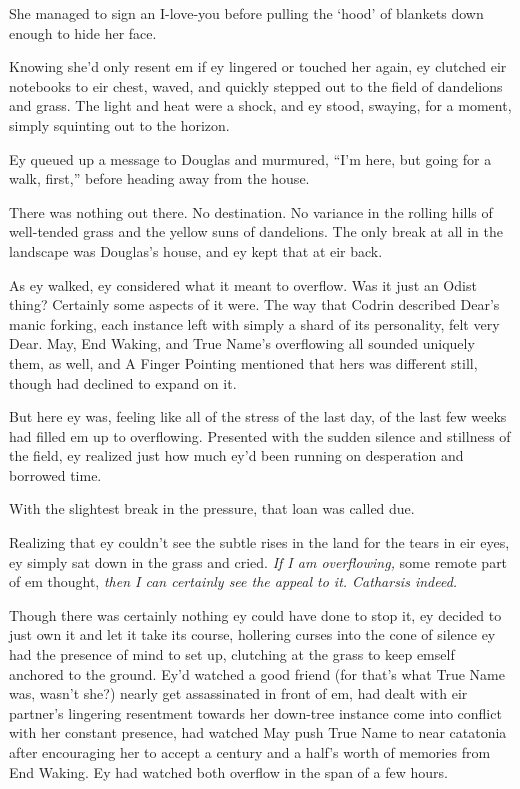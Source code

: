 She managed to sign an I-love-you before pulling the `hood' of blankets down enough to hide her face.

Knowing she'd only resent em if ey lingered or touched her again, ey clutched eir notebooks to eir chest, waved, and quickly stepped out to the field of dandelions and grass. The light and heat were a shock, and ey stood, swaying, for a moment, simply squinting out to the horizon.

Ey queued up a message to Douglas and murmured, ``I'm here, but going for a walk, first,'' before heading away from the house.

There was nothing out there. No destination. No variance in the rolling hills of well-tended grass and the yellow suns of dandelions. The only break at all in the landscape was Douglas's house, and ey kept that at eir back.

As ey walked, ey considered what it meant to overflow. Was it just an Odist thing? Certainly some aspects of it were. The way that Codrin described Dear's manic forking, each instance left with simply a shard of its personality, felt very Dear. May, End Waking, and True Name's overflowing all sounded uniquely them, as well, and A Finger Pointing mentioned that hers was different still, though had declined to expand on it.

But here ey was, feeling like all of the stress of the last day, of the last few weeks had filled em up to overflowing. Presented with the sudden silence and stillness of the field, ey realized just how much ey'd been running on desperation and borrowed time.

With the slightest break in the pressure, that loan was called due.

Realizing that ey couldn't see the subtle rises in the land for the tears in eir eyes, ey simply sat down in the grass and cried. \emph{If I am overflowing,} some remote part of em thought, \emph{then I can certainly see the appeal to it. Catharsis indeed.}

Though there was certainly nothing ey could have done to stop it, ey decided to just own it and let it take its course, hollering curses into the cone of silence ey had the presence of mind to set up, clutching at the grass to keep emself anchored to the ground. Ey'd watched a good friend (for that's what True Name was, wasn't she?) nearly get assassinated in front of em, had dealt with eir partner's lingering resentment towards her down-tree instance come into conflict with her constant presence, had watched May push True Name to near catatonia after encouraging her to accept a century and a half's worth of memories from End Waking. Ey had watched both overflow in the span of a few hours.

